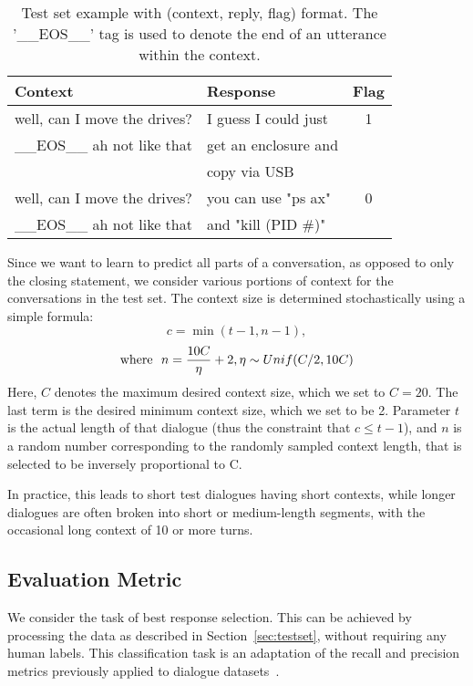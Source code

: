 \documentclass[11pt,a4paper]{article}
\begin{document}
\begin{table}[!ht]
\scriptsize
\begin{tabular}{|l |l |c|} \hline
Context & Response & Flag \\ \hline
well, can I move the drives? & I guess I could just  & 1 \\ \_\_EOS\_\_ ah not like that & get an enclosure and  & \\ 
& copy via USB & \\ \hline
well, can I move the drives? & you can use "ps ax"  & 0 \\ \_\_EOS\_\_ ah not like that & and "kill (PID \#)"  & \\ \hline
\end{tabular}
\caption{\label{table:triple1}Test set example with (context, reply, flag) format. The '\_\_EOS\_\_' tag is used to denote the end of an utterance within the context.} 
\end{table}


Since we want to learn to predict all parts of a conversation, as opposed to only the closing statement, we consider various portions of context for the conversations in the test set. The context size is determined stochastically using a simple formula:
$$
c = \min (t - 1, n - 1),
$$ $$
\textmd{where } \textmd{ } n = \frac{10C}{\eta} + 2, \eta \sim Unif(C/2,10C)
$$
Here, $C$ denotes the maximum desired context size, which we set to $C = 20$. The last term is the desired minimum context size, which we set to be 2. Parameter $t$ is the actual length of that dialogue (thus the constraint that $c \leq t-1$), and $n$ is a random number corresponding to the randomly sampled context length, that is selected to be inversely proportional to C.

In practice, this leads to short test dialogues having short contexts, while longer dialogues are often broken into short or medium-length segments, with the occasional long context of 10 or more turns.





\subsection{Evaluation Metric}

We consider the task of best response selection.   This can be achieved by processing the data as described in Section~\ref{sec:testset}, without requiring any human labels.     This classification task is an adaptation of the recall and precision metrics previously applied to dialogue datasets~\cite{schatzmann2005quantitative}.
\end{document}
